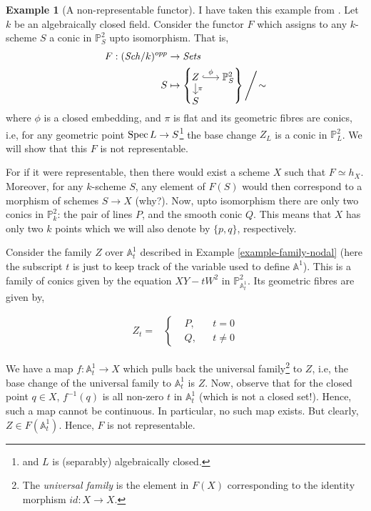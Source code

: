 \documentclass[11pt]{amsart}
\newcommand{\Spec}{{\rm Spec \,}}
\newcommand{\A}{{\mathbb A}}
\renewcommand{\P}{{\mathbb P}}
\theoremstyle{definition}
\newtheorem{example}[theorem]{Example}
\begin{document}
\begin{example}[A non-representable functor]
	\label{example-functor-of-conics} 
	I have taken this example from \cite{Bogges}. Let $k$ be an algebraically closed field. Consider the functor $F$ which assigns to any $k$-scheme $S$ a conic in $\P_S^2$ upto isomorphism. That is, 
	\begin{align*}
	F: (\mathit{Sch}/k)^{opp} & \rightarrow \mathit{Sets}\\
	S & \mapsto \left\{
	\begin{tikzcd}[cramped, row sep =2ex, column sep=4ex ,ampersand replacement=\&]
	Z\arrow[r,hook,"\phi"]\arrow[d,"\pi"] \& \P_S^2\\
	S
	\end{tikzcd}\right\} \Bigg/\!\sim
	\end{align*}
	where $\phi$ is a closed embedding, and $\pi$ is flat and its geometric fibres are conics, i.e, for any geometric point $\Spec L\rightarrow S$\footnote{and $L$ is (separably) algebraically closed.} the base change $Z_L$ is a conic in $\P_L^2$. We will show that this $F$ is not representable.
	
	For if it were representable, then there would exist a scheme $X$ such that $F\simeq h_X$. Moreover, for any $k$-scheme $S$, any element of $F(S)$ would then correspond to a morphism of schemes $S\rightarrow X$ (why?). Now, upto isomorphism there are only two conics in $\P_k^2$: the pair of lines $P$, and the smooth conic $Q$. This means that $X$ has only two $k$ points which we will also denote by $\{p,q\}$, respectively.
	
	Consider the family $Z$ over $\A_t^1$ described in Example \ref{example-family-nodal} (here the subscript $t$ is just to keep track of the variable used to define $\A^1$). This is a family of conics given by the equation $XY-tW^2$ in $\P_{\A_t^1}^2$. Its geometric fibres are given by,
	\begin{center}
		\begin{align*}
		Z_t = &\left\{
		\begin{aligned}
		& P,  && t=0\\
		& Q,  && t\neq 0
		\end{aligned}\right.
		\end{align*}
	\end{center}
	We have a map $f:\A_t^1\rightarrow X$ which pulls back the universal family\footnote{The \textit{universal family} is the element in $F(X)$ corresponding to the identity morphism $id: X\rightarrow X$.} to $Z$, i.e, the base change of the universal family to $\A_t^1$ is $Z$. Now, observe that for the closed point $q\in X$, $f^{-1}(q)$ is all non-zero $t$ in $\A_t^1$ (which is not a closed set!). Hence, such a map cannot be continuous. In particular, no such map exists. But clearly, $Z\in F(\A_t^1)$. Hence, $F$ is not representable.
\end{example}
\end{document}

